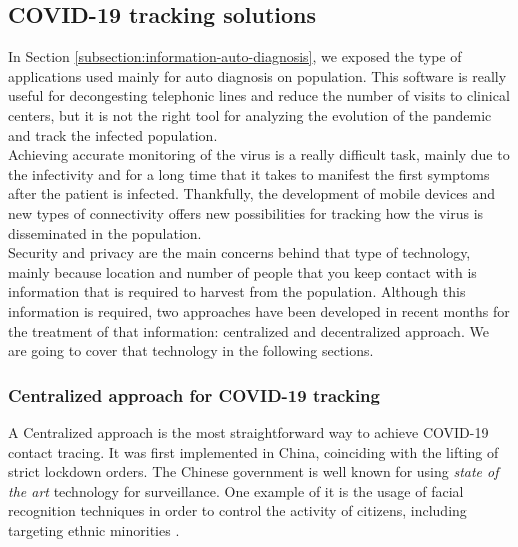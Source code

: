 \documentclass[a4paper, 12pt]{article}
\begin{document}
\subsection{COVID-19 tracking solutions}
\label{subsection:covid-19-tracking}

In Section \ref{subsection:information-auto-diagnosis}, we exposed the type of applications used mainly for auto diagnosis on population. This software is really useful for decongesting telephonic lines and reduce the number of visits to clinical centers, but it is not the right tool for analyzing the evolution of the pandemic and track the infected population.\\

Achieving accurate monitoring of the virus is a really difficult task, mainly due to the infectivity and for a long time that it takes to manifest the first symptoms after the patient is infected. Thankfully, the development of mobile devices and new types of connectivity offers new possibilities for tracking how the virus is disseminated in the population. \\

Security and privacy are the main concerns behind that type of technology, mainly because location and number of people that you keep contact with is information that is required to harvest from the population. Although this information is required, two approaches have been developed in recent months for the treatment of that information: centralized and decentralized approach. We are going to cover that technology in the following sections. \\

\subsubsection{Centralized approach for COVID-19 tracking}
\label{subsubsection:centralized-approach}

A Centralized approach is the most straightforward way to achieve COVID-19 contact tracing. It was first implemented in China, coinciding with the lifting of strict lockdown orders. The Chinese government is well known for using \textit{state of the art} technology for surveillance. One example of it is the usage of facial recognition techniques in order to control the activity of citizens, including targeting ethnic minorities \cite{china-massive-covid-tracking}. \\
\end{document}
